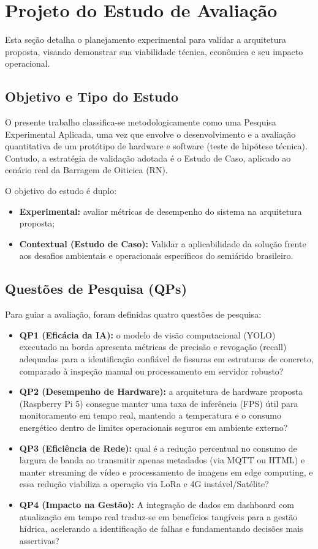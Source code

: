 \chapter{Projeto do Estudo de Avaliação}
\label{cap:cap4}

Esta seção detalha o planejamento experimental para validar a arquitetura proposta, visando demonstrar sua viabilidade técnica, econômica e seu impacto operacional.

\section{Objetivo e Tipo do Estudo}
O presente trabalho classifica-se metodologicamente como uma Pesquisa Experimental Aplicada, uma vez que envolve o desenvolvimento e a avaliação quantitativa de um protótipo de hardware e software (teste de hipótese técnica). Contudo, a estratégia de validação adotada é o Estudo de Caso, aplicado ao cenário real da Barragem de Oiticica (RN).

O objetivo do estudo é duplo:
\begin{itemize}
    \item \textbf{Experimental:} avaliar métricas de desempenho do sistema na arquitetura proposta;
    \item \textbf{Contextual (Estudo de Caso):} Validar a aplicabilidade da solução frente aos desafios ambientais e operacionais específicos do semiárido brasileiro.
\end{itemize}

\section{Questões de Pesquisa (QPs)}
Para guiar a avaliação, foram definidas quatro questões de pesquisa:
\begin{itemize}
    \item \textbf{QP1 (Eficácia da IA):} o modelo de visão computacional (YOLO) executado na borda apresenta métricas de precisão e revogação (recall) adequadas para a identificação confiável de fissuras em estruturas de concreto, comparado à inspeção manual ou processamento em servidor robusto?
    \item \textbf{QP2 (Desempenho de Hardware):} a arquitetura de hardware proposta (Raspberry Pi 5) consegue manter uma taxa de inferência (FPS) útil para monitoramento em tempo real, mantendo a temperatura e o consumo energético dentro de limites operacionais seguros em ambiente externo?
    \item \textbf{QP3 (Eficiência de Rede):} qual é a redução percentual no consumo de largura de banda ao transmitir apenas metadados (via MQTT ou HTML) e manter streaming de vídeo e processamento de imagens em edge computing, e essa redução viabiliza a operação via LoRa e 4G instável/Satélite?
    \item \textbf{QP4 (Impacto na Gestão):} A integração de dados em dashboard com atualização em tempo real traduz-se em benefícios tangíveis para a gestão hídrica, acelerando a identificação de falhas e fundamentando decisões mais assertivas?
\end{itemize}

